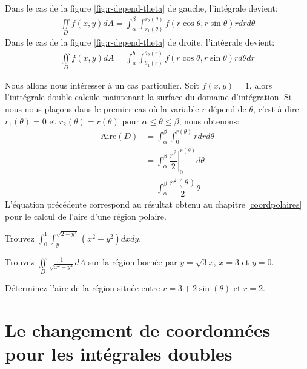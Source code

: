 \documentclass[]{book}
\theoremstyle{definition}
\theoremstyle{definition}
\theoremstyle{definition}
\theoremstyle{remark}
\let\BeginKnitrBlock\begin \let\EndKnitrBlock\end
\begin{document}
Dans le cas de la figure \ref{fig:r-depend-theta} de gauche, l'intégrale
devient: \begin{align*}
\iint\limits_D f(x,y)dA=\int_{\alpha }^{\beta}\int_{r_1(\theta)}^{r_2(\theta)}f(r\cos\theta,r\sin\theta)rdrd\theta
\end{align*} Dans le cas de la figure \ref{fig:r-depend-theta} de
droite, l'intégrale devient: \begin{align*}
\iint\limits_Df(x,y)dA=\int_{a}^{b}\int_{\theta_1(r)}^{\theta_2(r)}f(r\cos\theta,r\sin\theta)rd\theta dr
\end{align*}

\BeginKnitrBlock{remark}
{}Nous allons nous intéresser à un cas
particulier. Soit \(f(x,y)=1\), alors l'inttégrale double calcule
maintenant la surface du domaine d'intégration. Si nous nous plaçons
dans le premier cas où la variable \(r\) dépend de \(\theta\),
c'est-à-dire \(r_1(\theta)=0\) et \(r_2(\theta)=r(\theta)\) pour
\(\alpha \leq \theta \leq \beta\), nous obtenons: \begin{align*}
\text{Aire}(D)&=\int_{\alpha }^{\beta }\int_0^{r(\theta)}rdrd\theta\\
&=\int_{\alpha }^{\beta }\left.\dfrac{r^2}{2}\right|_0^{r(\theta)}d\theta\\
&=\int_{\alpha }^{\beta }\dfrac{r^2(\theta)}{2}\theta
\end{align*} L'équation précédente correspond au résultat obtenu au
chapitre \ref{coordpolaires} pour le calcul de l'aire d'une région
polaire.
\EndKnitrBlock{remark}

\BeginKnitrBlock{example}
\protect\hypertarget{exm:unnamed-chunk-262}{}{\label{exm:unnamed-chunk-262}
}Trouvez \(\int_0^1 \int_y^{\sqrt{2-y^2}} (x^2+y^2) dx dy\).
\EndKnitrBlock{example}
\vspace*{8cm}

\BeginKnitrBlock{example}
\protect\hypertarget{exm:unnamed-chunk-263}{}{\label{exm:unnamed-chunk-263}
}Trouvez \(\iint\limits_D \frac{1}{\sqrt{x^2+y^2}}dA\) sur la région
bornée par \(y=\sqrt{3}x\), \(x=3\) et \(y=0\).
\EndKnitrBlock{example}
\vspace*{8cm}

\BeginKnitrBlock{example}
\protect\hypertarget{exm:unnamed-chunk-264}{}{\label{exm:unnamed-chunk-264}
}Déterminez l'aire de la région située entre \(r=3+2\sin(\theta)\) et
\(r=2\).
\EndKnitrBlock{example}
\vspace*{8cm}

\hypertarget{jacobien2d}{%
\section{Le changement de coordonnées pour les intégrales
doubles}\label{jacobien2d}}
\end{document}
